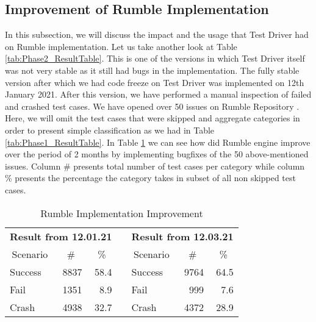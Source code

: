 \subsection{Improvement of Rumble Implementation}
In this subsection, we will discuss the impact and the usage that Test Driver had on Rumble implementation. Let us take another look at Table \ref{tab:Phase2_ResultTable}. This is one of the versions in which Test Driver itself was not very stable as it still had bugs in the implementation. The fully stable version after which we had code freeze on Test Driver was implemented on 12th January 2021. After this version, we have performed a manual inspection of failed and crashed test cases. We have opened over 50 issues on Rumble Repository \cite{IssuesSubmitted}. Here, we will omit the test cases that were skipped and aggregate categories in order to present simple classification as we had in Table \ref{tab:Phase1_ResultTable}. In Table \ref{tab:bugsimprovement} we can see how did Rumble engine improve over the period of 2 months by implementing bugfixes of the 50 above-mentioned issues. Column \# presents total number of test cases per category while column \% presents the percentage the category takes in subset of all non skipped test cases.
 
\begin{table}[h!]
	\vspace{-4mm}
	\centering
	\begin{tabular}{|l|r|r|r|l|r|r|}
		\cline{1-3} \cline{5-7}
		\multicolumn{3}{|c|}{\textbf{Result from 12.01.21}}                                & \multicolumn{1}{l|}{}          & \multicolumn{3}{c|}{\textbf{Result from 12.03.21}}                                \\ \cline{1-3} \cline{5-7} 
		\multicolumn{1}{|c|}{Scenario} & \multicolumn{1}{c|}{\#} & \multicolumn{1}{c|}{\%} & \multicolumn{1}{c|}{\textbf{}} & \multicolumn{1}{c|}{Scenario} & \multicolumn{1}{c|}{\#} & \multicolumn{1}{c|}{\%} \\ \cline{1-3} \cline{5-7} 
		Success                        & 8837                    & 58.4                    &                                & Success                       & 9764                    & 64.5                    \\ \cline{1-3} \cline{5-7} 
		Fail                           & 1351                    & 8.9                     &                                & Fail                          & 999                     & 7.6                     \\ \cline{1-3} \cline{5-7} 
		Crash                          & 4938                    & 32.7                    &                                & Crash                         & 4372                    & 28.9                    \\ \cline{1-3} \cline{5-7} 
	\end{tabular}
	\caption{Rumble Implementation Improvement}
	\label{tab:bugsimprovement}
	\vspace{-5mm}
\end{table}

